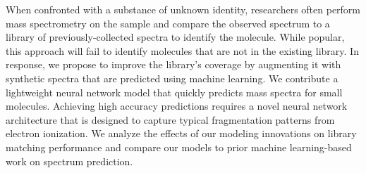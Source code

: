 When confronted with a substance of unknown identity, researchers often perform mass spectrometry on the sample and compare the observed spectrum to a library of previously-collected spectra to identify the molecule. While popular, this approach will fail to identify molecules that are not in the existing library. In response, we propose to improve the library’s coverage by augmenting it with synthetic spectra that are predicted using machine learning. We contribute a lightweight neural network model that quickly predicts mass spectra for small molecules. Achieving high accuracy predictions requires a novel neural network architecture that is designed to capture typical fragmentation patterns from electron ionization. We analyze the effects of our modeling innovations on library matching performance and compare our models to prior machine learning-based work on spectrum prediction.
